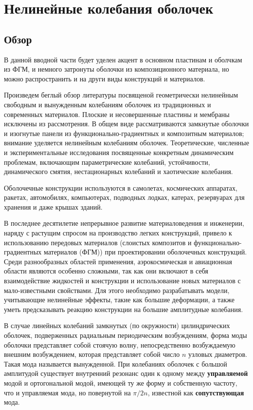\chapter{Нелинейные колебания оболочек}\label{ch:ch3}

\section{Обзор} \label{ch:ch3/sec1}

{\color{blue}
В данной вводной части будет уделен акцент в основном пластинам и оболчкам из ФГМ, и немного затронуты оболочки из композиционного материала, но можно распространить и на други виды конструкций и материалов.


Произведем беглый обзор литературы посвященой геометрически нелинейным свободным и вынужденным колебаниям оболочек из традиционных и современных материалов. Плоские и несовершенные пластины и мембраны исключены из рассмотрения. В общем виде рассматриваются замкнутые оболочки и изогнутые панели из функционально-градиентных и композитным материалов; внимание уделяется нелинейным колебаниям оболочек. Теоретические, численные и экспериментальные исследования посвященные конкретным динамическим проблемам, включающим параметрические колебаний, устойчивости, динамического смятия, нестационарных колебаний и хаотические колебания.
}

Оболочечные конструкции используются в самолетах, космических аппаратах, ракетах, автомобилях, компьютерах, подводных лодках, катерах, резервуарах для хранения и даже крышах зданий.

В последнее десятилетие непрерывное развитие материаловедения и инженерии, наряду с растущим спросом на производство легких конструкций, привело к использованию передовых материалов (слоистых композитов и функционально-градиентных материалов (ФГМ)) при проектировании оболочечных конструкций. Среди разнообразных областей применения, аэрокосмическая и авиационная области являются особенно сложными, так как они включают в себя взаимодействие жидкостей  и конструкции и использование новых материалов с мало-известными свойствами. Для этого необходимо разрабатывать модели, учитывающие нелинейные эффекты, такие как большие деформации, а также уметь предсказывать реакцию конструкции на большие амплитудные колебания.


В случае линейных колебаний замкнутых (по окружности) цилиндрических оболочек, подверженных радиальным периодическим возбуждениям, форма моды оболочки представляет собой стоячую волну, непосредственно возбуждаемую внешним возбуждением, которая представляет собой число \(n\) узловых диаметров. Такая мода называется вынужденной. При колебаниях оболочек с большой амплитудой существует внутренний резонанс один к одному между \textbf{управляемой} модой и ортогональной модой, имеющей ту же форму и собственную частоту, что и управляемая мода, но повернутой на \(\pi/2n\), известной как \textbf{сопутствующая} мода. 

